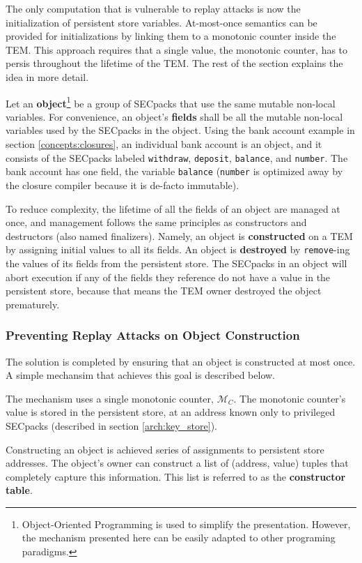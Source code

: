The only computation that is vulnerable to replay attacks is now the
initialization of persistent store variables. At-most-once semantics can be
provided for initializations by linking them to a monotonic counter inside the
TEM. This approach requires that a single value, the monotonic counter, has to
persis throughout the lifetime of the TEM. The rest of the section explains
the idea in more detail.

Let an \textbf{object}\footnote{Object-Oriented Programming is used to simplify
the presentation. However, the mechanism presented here can be easily
adapted to other programing paradigms.} be a group of SECpacks that use the
same mutable non-local variables. For convenience, an object's \textbf{fields}
shall be all the mutable non-local variables used by the SECpacks in the
object. Using the bank account example in section \ref{concepts:closures}, an
individual bank account is an object, and it consists of the SECpacks labeled
\texttt{withdraw}, \texttt{deposit}, \texttt{balance}, and \texttt{number}. The
bank account has one field, the variable \texttt{balance} (\texttt{number} is
optimized away by the closure compiler because it is de-facto immutable).

To reduce complexity, the lifetime of all the fields of an object are managed
at once, and management follows the same principles as constructors and
destructors (also named finalizers). Namely, an object is \textbf{constructed}
on a TEM by assigning initial values to all its fields. An object is
\textbf{destroyed} by \texttt{remove}-ing the values of its fields from the
persistent store. The SECpacks in an object will abort execution if any of
the fields they reference do not have a value in the persistent store,
because that means the TEM owner destroyed the object prematurely.

\subsubsection{Preventing Replay Attacks on Object Construction}
The solution is completed by ensuring that an object is constructed at most
once. A simple mechansim that achieves this goal is described below.

The mechanism uses a single monotonic counter, $\mathcal{M}_C$. The monotonic
counter's value is stored in the persistent store, at an address known only to
privileged SECpacks (described in section \ref{arch:key_store}). 

Constructing an object is achieved series of assignments to persistent store
addresses. The object's owner can construct a list of (address, value) tuples
that completely capture this information. This list is referred to as the
\textbf{constructor table}. 

